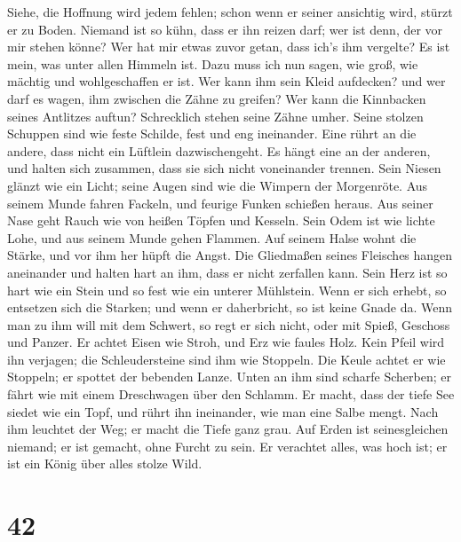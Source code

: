  Siehe, die Hoffnung wird jedem fehlen; schon wenn er
seiner ansichtig wird, stürzt er zu Boden.  Niemand ist so
kühn, dass er ihn reizen darf; wer ist denn, der vor mir stehen könne?
 Wer hat mir etwas zuvor getan, dass ich's ihm vergelte?
Es ist mein, was unter allen Himmeln ist.  Dazu muss ich
nun sagen, wie groß, wie mächtig und wohlgeschaffen er ist.
 Wer kann ihm sein Kleid aufdecken? und wer darf es wagen,
ihm zwischen die Zähne zu greifen?  Wer kann die
Kinnbacken seines Antlitzes auftun? Schrecklich stehen seine Zähne
umher.  Seine stolzen Schuppen sind wie feste Schilde,
fest und eng ineinander.  Eine rührt an die andere, dass
nicht ein Lüftlein dazwischengeht.  Es hängt eine an der
anderen, und halten sich zusammen, dass sie sich nicht voneinander
trennen.  Sein Niesen glänzt wie ein Licht; seine Augen
sind wie die Wimpern der Morgenröte.  Aus seinem Munde
fahren Fackeln, und feurige Funken schießen heraus.  Aus
seiner Nase geht Rauch wie von heißen Töpfen und Kesseln.
 Sein Odem ist wie lichte Lohe, und aus seinem Munde
gehen Flammen.  Auf seinem Halse wohnt die Stärke, und
vor ihm her hüpft die Angst.  Die Gliedmaßen seines
Fleisches hangen aneinander und halten hart an ihm, dass er nicht
zerfallen kann.  Sein Herz ist so hart wie ein Stein und
so fest wie ein unterer Mühlstein.  Wenn er sich erhebt,
so entsetzen sich die Starken; und wenn er daherbricht, so ist keine
Gnade da.  Wenn man zu ihm will mit dem Schwert, so regt
er sich nicht, oder mit Spieß, Geschoss und Panzer.  Er
achtet Eisen wie Stroh, und Erz wie faules Holz.  Kein
Pfeil wird ihn verjagen; die Schleudersteine sind ihm wie Stoppeln.
 Die Keule achtet er wie Stoppeln; er spottet der
bebenden Lanze.  Unten an ihm sind scharfe Scherben; er
fährt wie mit einem Dreschwagen über den Schlamm.  Er
macht, dass der tiefe See siedet wie ein Topf, und rührt ihn ineinander,
wie man eine Salbe mengt.  Nach ihm leuchtet der Weg; er
macht die Tiefe ganz grau.  Auf Erden ist seinesgleichen
niemand; er ist gemacht, ohne Furcht zu sein.  Er
verachtet alles, was hoch ist; er ist ein König über alles stolze Wild.

\hypertarget{section-41}{%
\section{42}\label{section-41}}

